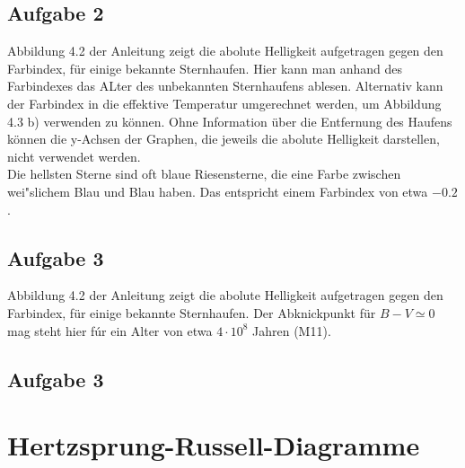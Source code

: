 \documentclass[12pt]{article}
\begin{document}
\subsection{Aufgabe 2}

Abbildung 4.2 der Anleitung zeigt die abolute Helligkeit aufgetragen gegen den Farbindex, f\"{u}r einige bekannte Sternhaufen. Hier kann man anhand des Farbindexes das ALter des unbekannten Sternhaufens ablesen. Alternativ kann der Farbindex in die effektive Temperatur umgerechnet werden, um Abbildung 4.3 b) verwenden zu k\"{o}nnen. Ohne Information \"{u}ber die Entfernung des Haufens k\"{o}nnen die y-Achsen der Graphen, die jeweils die abolute Helligkeit darstellen, nicht verwendet werden. \\
Die hellsten Sterne sind oft blaue Riesensterne, die eine Farbe zwischen wei"slichem Blau und Blau haben. Das entspricht einem Farbindex von etwa $-0.2$.


\subsection{Aufgabe 3}

Abbildung 4.2 der Anleitung zeigt die abolute Helligkeit aufgetragen gegen den Farbindex, f\"{u}r einige bekannte Sternhaufen. Der Abknickpunkt f\"{u}r $B-V\simeq 0$\,mag steht hier f\'{u}r ein Alter von etwa $4\cdot 10^8$ Jahren (M11).

\subsection{Aufgabe 3}








\section{Hertzsprung-Russell-Diagramme}
\end{document}
